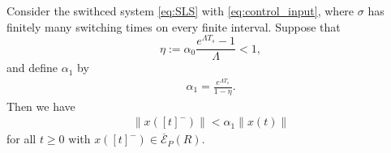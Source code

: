 \documentclass[a4, 11pt]{article}
\begin{document}
\begin{lemma}
\label{lem:alpha1_bound}
Consider the swithced system \eqref{eq:SLS} with
\eqref{eq:control_input}, where $\sigma$ has finitely many switching times
on every finite interval.
Suppose that
\begin{equation}
\label{eq:alpha_0_condition}
\eta := \alpha_0 \frac{e^{\Lambda T_s} - 1}{\Lambda} < 1,
\end{equation}
and define $\alpha_1$ by
\begin{align*}
\alpha_1 = 
\frac{e^{\Lambda T_s}}{1 - \eta}.
\end{align*}
Then 
we have
\begin{align}
\label{eq:alpha1_bound}
\| x([t]^-)\| <
\alpha_1 \|x(t)\|
\end{align}
for all $t \geq 0$ with 
$x([t]^-) \in
\overline{\mathcal{E}}_P(R)$.
\end{lemma}
\end{document}
